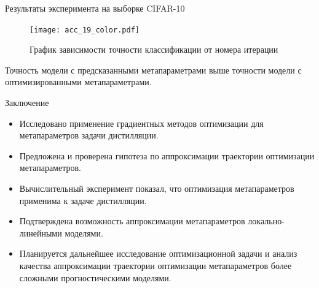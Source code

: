 \documentclass[10pt, aspectratio=169]{beamer}
\begin{document}
\begin{frame}{Результаты эксперимента на выборке CIFAR-10}
\begin{figure}
    \caption*{График зависимости точности классификации от номера итерации}
    \texttt{[image: acc\_19\_color.pdf]}
\end{figure}
Точность модели с предсказанными метапараметрами выше точности модели с оптимизированными метапараметрами.
\end{frame}
\begin{frame}{Заключение}
    \begin{itemize}
        \item Исследовано применение градиентных методов оптимизации для метапараметров задачи дистилляции.
        \item Предложена и проверена гипотеза по аппроксимации траектории оптимизации метапараметров. 
        \item Вычислительный эксперимент показал, что оптимизация метапараметров применима к задаче дистилляции. 
        \item Подтверждена возможность аппроксимации метапараметров локально-линейными моделями. 
        \item Планируется дальнейшее исследование оптимизационной задачи и анализ качества  аппроксимации траектории оптимизации метапараметров более сложными прогностическими моделями.
    \end{itemize}
\end{frame}


\end{document}
